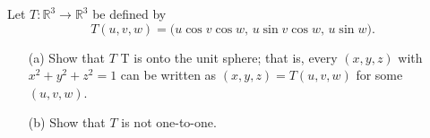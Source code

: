 Let \( T : \mathbb{R}^3 \to \mathbb{R}^3 \) be defined by
\[
T(u, v, w) = \big(u \cos v \cos w, \, u \sin v \cos w, \, u \sin w\big).
\]

\begin{enumerate}
    \item[(a)]  Show that \( T \) T is onto the unit sphere; that is, every \( (x, y, z) \) with \( x^2 + y^2 + z^2 = 1 \) can be written as \( (x, y, z) = T(u, v, w) \) for some \( (u, v, w) \).
    \item[(b)]  Show that \( T \) is not one-to-one.
\end{enumerate}
